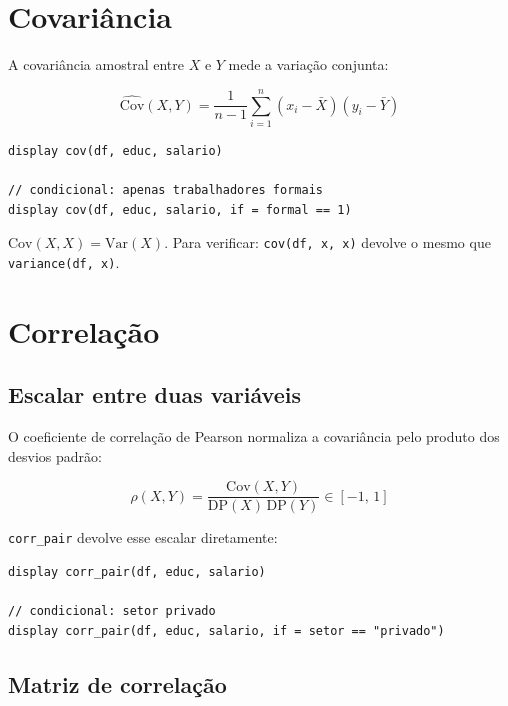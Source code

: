 \section{Covariância}

A covariância amostral entre $X$ e $Y$ mede a variação conjunta:

\[
  \widehat{\mathrm{Cov}}(X, Y)
  = \frac{1}{n-1}\sum_{i=1}^{n}(x_i - \bar{X})(y_i - \bar{Y})
\]

\begin{lstlisting}[caption={Covariância entre duas colunas}]
display cov(df, educ, salario)

// condicional: apenas trabalhadores formais
display cov(df, educ, salario, if = formal == 1)
\end{lstlisting}

\begin{nota}
  $\mathrm{Cov}(X, X) = \mathrm{Var}(X)$. Para verificar:
  \lstinline{cov(df, x, x)} devolve o mesmo que \lstinline{variance(df, x)}.
\end{nota}

\section{Correlação}

\subsection{Escalar entre duas variáveis}

O coeficiente de correlação de Pearson normaliza a covariância pelo produto dos
desvios padrão:

\[
  \rho(X, Y) = \frac{\mathrm{Cov}(X,Y)}{\mathrm{DP}(X)\,\mathrm{DP}(Y)}
  \in [-1,\, 1]
\]

\lstinline{corr_pair} devolve esse escalar diretamente:

\begin{lstlisting}[caption={Correlação escalar}]
display corr_pair(df, educ, salario)

// condicional: setor privado
display corr_pair(df, educ, salario, if = setor == "privado")
\end{lstlisting}

\subsection{Matriz de correlação}

